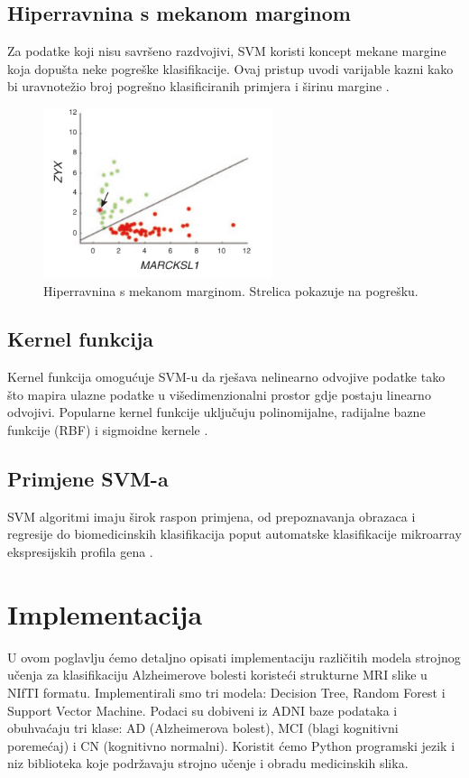 \documentclass[zavrsnirad]{fer}
\begin{document}
\subsection{Hiperravnina s mekanom marginom}
Za podatke koji nisu savršeno razdvojivi, SVM koristi koncept mekane margine koja dopušta neke pogreške klasifikacije. Ovaj pristup uvodi varijable kazni kako bi uravnotežio broj pogrešno klasificiranih primjera i širinu margine \cite{fletcher2009}.
\begin{figure}[h]
	\centering
	\includegraphics[width=0.6\textwidth]{Figures/soft_margin.png}
	\caption{Hiperravnina s mekanom marginom. Strelica pokazuje na pogrešku. \cite{Noble2006}}
	\label{fig:soft_margin}
\end{figure}

\subsection{Kernel funkcija}
Kernel funkcija omogućuje SVM-u da rješava nelinearno odvojive podatke tako što mapira ulazne podatke u višedimenzionalni prostor gdje postaju linearno odvojivi. Popularne kernel funkcije uključuju polinomijalne, radijalne bazne funkcije (RBF) i sigmoidne kernele \cite{Gammermann2000}.

\subsection{Primjene SVM-a}
SVM algoritmi imaju širok raspon primjena, od prepoznavanja obrazaca i regresije do biomedicinskih klasifikacija poput automatske klasifikacije mikroarray ekspresijskih profila gena \cite{Noble2006}.



\section{Implementacija}

U ovom poglavlju ćemo detaljno opisati implementaciju različitih modela strojnog učenja za klasifikaciju Alzheimerove bolesti koristeći strukturne MRI slike u NIfTI formatu. Implementirali smo tri modela: Decision Tree, Random Forest i Support Vector Machine. Podaci su dobiveni iz ADNI baze podataka i obuhvaćaju tri klase: AD (Alzheimerova bolest), MCI (blagi kognitivni poremećaj) i CN (kognitivno normalni). Koristit ćemo Python programski jezik i niz biblioteka koje podržavaju strojno učenje i obradu medicinskih slika.
\end{document}
